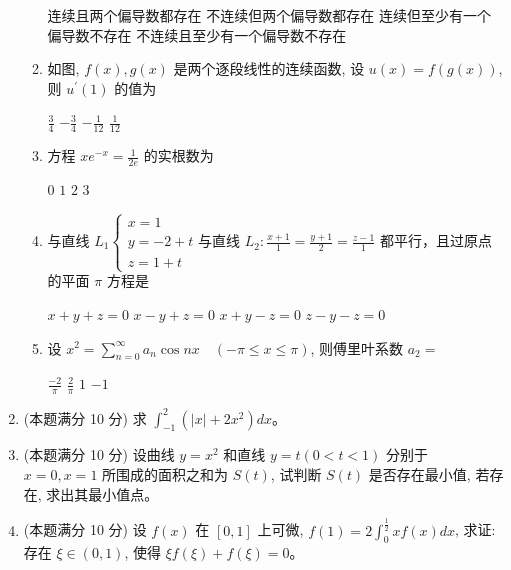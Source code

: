 \begin{enumerate}
\begin{enumerate}
\fourchoices
{连续且两个偏导数都存在}
{不连续但两个偏导数都存在}
{连续但至少有一个偏导数不存在}
{不连续且至少有一个偏导数不存在}

\item 
如图, $f(x), g(x)$ 是两个逐段线性的连续函数, 设 $u(x)=f(g(x))$, 则 $u^{\prime}(1)$ 的值为  
\begin{figure}[h!]
	\centering
	
\end{figure}

\fourchoices
{$\frac{3}{4}$}
{$-\frac{3}{4}$}
{$-\frac{1}{12}$}
{$\frac{1}{12}$}



\item
方程 $x e^{-x}=\frac{1}{2 e}$ 的实根数为  


\fourchoices
{$ 0 $}
{$ 1 $}
{$ 2 $}
{$ 3 $}

\item 
与直线 $L_{1}\left\{\begin{array}{l}x=1 \\ y=-2+t \text { 与直线 } L_{2}: \frac{x+1}{1}=\frac{y+1}{2}=\frac{z-1}{1} \text { 都平行，且过原点 } \\ z=1+t\end{array}\right.$
的平面 $\pi$ 方程是  


\fourchoices
{$x+y+z=0$}
{$x-y+z=0$}
{$x+y-z=0$}
{$z-y-z=0$}

\item 
设 $x^{2}=\sum\limits_{n=0}^{\infty} a_{n} \cos n x \quad(-\pi \leqslant x \leqslant \pi)$, 则傅里叶系数 $a_{2}=$  


\fourchoices
{$\frac{-2}{\pi}$}
{$\frac{2}{\pi}$}
{$ 1 $}
{$-1$}




	
	
	
\end{enumerate}



\item 
(本题满分 10 分)
求 $\int_{-1}^{2}\left(|x|+2 x^{2}\right) d x$。


\item 
(本题满分 10 分)
设曲线 $y=x^{2}$ 和直线 $y=t(0<t<1)$ 分别于 $x=0, x=1$ 所围成的面积之和为 $S(t)$, 试判断 $S(t)$ 是否存在最小值, 若存在, 求出其最小值点。



\item 
(本题满分 10 分)
设 $f(x)$ 在 $[0,1]$ 上可微, $f(1)=2 \int_{0}^{\frac{1}{2}} x f(x) d x$, 求证:
存在 $\xi \in(0,1)$, 使得 $\xi f(\xi)+f(\xi)=0$。


\end{enumerate}
